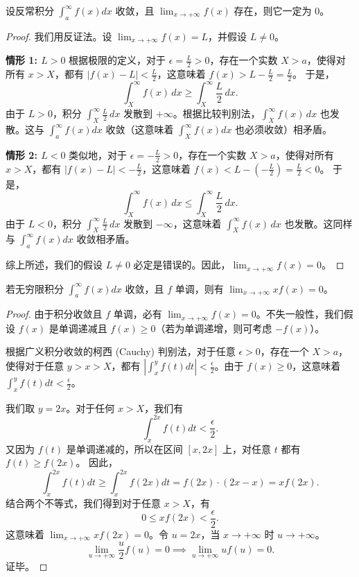 \documentclass[lang=cn,10pt,thmcnt=section]{elegantbook}
\begin{document}
\begin{example}
    设反常积分 \(\int_{a}^{\infty} f(x) dx\) 收敛，且 \(\lim_{x \to +\infty} f(x)\) 存在，则它一定为 0。
\end{example}
\begin{proof}
    我们用反证法。设 $\lim_{x \to +\infty} f(x) = L$，并假设 $L \neq 0$。
    
    \textbf{情形 1: \(L > 0\)}
    根据极限的定义，对于 $\epsilon = \frac{L}{2} > 0$，存在一个实数 $X > a$，使得对所有 $x > X$，都有 $|f(x) - L| < \frac{L}{2}$，这意味着 $f(x) > L - \frac{L}{2} = \frac{L}{2}$。
    于是，
    \[
    \int_X^\infty f(x) \, dx \ge \int_X^\infty \frac{L}{2} \, dx.
    \]
    由于 $L>0$，积分 $\int_X^\infty \frac{L}{2} \, dx$ 发散到 $+\infty$。根据比较判别法，$\int_X^\infty f(x) \, dx$ 也发散。这与 $\int_a^\infty f(x) dx$ 收敛（这意味着 $\int_X^\infty f(x) dx$ 也必须收敛）相矛盾。
    
    \textbf{情形 2: \(L < 0\)}
    类似地，对于 $\epsilon = -\frac{L}{2} > 0$，存在一个实数 $X > a$，使得对所有 $x > X$，都有 $|f(x) - L| < -\frac{L}{2}$，这意味着 $f(x) < L - (-\frac{L}{2}) = \frac{L}{2} < 0$。
    于是，
    \[
    \int_X^\infty f(x) \, dx \le \int_X^\infty \frac{L}{2} \, dx.
    \]
    由于 $L<0$，积分 $\int_X^\infty \frac{L}{2} \, dx$ 发散到 $-\infty$，这意味着 $\int_X^\infty f(x) \, dx$ 也发散。这同样与 $\int_a^\infty f(x) dx$ 收敛相矛盾。
    
    综上所述，我们的假设 $L \neq 0$ 必定是错误的。因此，$\lim_{x \to +\infty} f(x) = 0$。
\end{proof}

\begin{example}
    若无穷限积分 \(\int_{a}^{\infty} f(x) dx\) 收敛，且 \(f\) 单调，则有 \(\lim_{x \to +\infty} x f(x) = 0\)。
\end{example}
\begin{proof}
    由于积分收敛且 $f$ 单调，必有 $\lim_{x \to +\infty} f(x) = 0$。不失一般性，我们假设 $f(x)$ 是单调递减且 $f(x) \ge 0$（若为单调递增，则可考虑 $-f(x)$）。
    
    根据广义积分收敛的柯西 (Cauchy) 判别法，对于任意 $\epsilon > 0$，存在一个 $X > a$，使得对于任意 $y > x > X$，都有 $\left|\int_x^y f(t) dt\right| < \frac{\epsilon}{2}$。由于 $f(x) \ge 0$，这意味着 $\int_x^y f(t) dt < \frac{\epsilon}{2}$。
    
    我们取 $y = 2x$。对于任何 $x > X$，我们有
    \[
    \int_x^{2x} f(t) dt < \frac{\epsilon}{2}.
    \]
    又因为 $f(t)$ 是单调递减的，所以在区间 $[x, 2x]$ 上，对任意 $t$ 都有 $f(t) \ge f(2x)$。
    因此，
    \[
    \int_x^{2x} f(t) dt \ge \int_x^{2x} f(2x) dt = f(2x) \cdot (2x - x) = x f(2x).
    \]
    结合两个不等式，我们得到对于任意 $x>X$，有
    \[
    0 \le x f(2x) < \frac{\epsilon}{2}.
    \]
    这意味着 $\lim_{x \to +\infty} x f(2x) = 0$。令 $u=2x$，当 $x \to +\infty$ 时 $u \to +\infty$。
    \[
    \lim_{u \to +\infty} \frac{u}{2} f(u) = 0 \implies \lim_{u \to +\infty} u f(u) = 0.
    \]
    证毕。
\end{proof}
\end{document}
